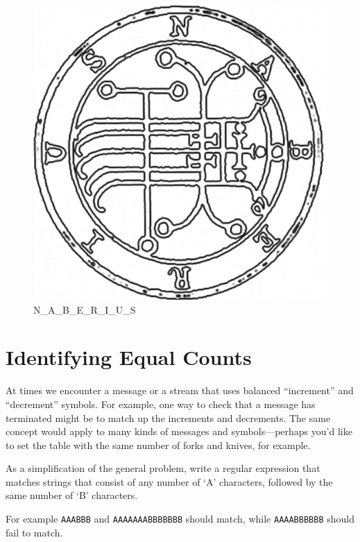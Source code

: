 \begin{figure}
\centering
\includegraphics{images/N_A_B_E_R_I_U_S.jpg}
\caption{N\_A\_B\_E\_R\_I\_U\_S}
\end{figure}

\newpage

\hypertarget{identifying-equal-counts}{%
\section{Identifying Equal Counts}\label{identifying-equal-counts}}

At times we encounter a message or a stream that uses balanced
``increment'' and ``decrement'' symbols. For example, one way to check
that a message has terminated might be to match up the increments and
decrements. The same concept would apply to many kinds of messages and
symbols---perhaps you'd like to set the table with the same number of
forks and knives, for example.

As a simplification of the general problem, write a regular expression
that matches strings that consist of any number of `A' characters,
followed by the same number of `B' characters.

For example \texttt{AAABBB} and \texttt{AAAAAAABBBBBBB} should match,
while \texttt{AAAABBBBBB} should fail to match.

